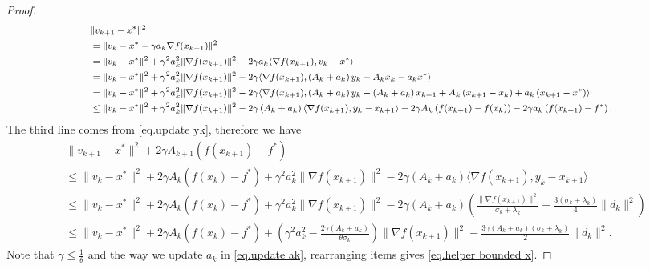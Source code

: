 \documentclass{article}
\begin{document}
\begin{proof}
    \begin{equation*}
    \footnotesize
        \begin{aligned}
            &\|v_{k+1}-x^*\|^2\\
            &= \|v_k-x^* -\gamma a_k \nabla f(x_{k+1})\|^2 \\
            &= \|v_k-x^*\|^2 +\gamma^2 a_k^2 \|\nabla f(x_{k+1})\|^2 -2\gamma a_k \langle \nabla f(x_{k+1}),v_k-x^*\rangle\\
            &= \|v_k-x^*\|^2 +\gamma^2 a_k^2 \|\nabla f(x_{k+1})\|^2 -2\gamma \langle \nabla f(x_{k+1}), \left (A_k+a_k\right)y_k-A_k x_k-a_k x^* \rangle\\
            &=\|v_k-x^*\|^2 +\gamma^2 a_k^2 \|\nabla f(x_{k+1})\|^2-2\gamma \langle \nabla f(x_{k+1}), \left (A_k+a_k\right)y_k-\left(A_k+a_k\right)x_{k+1}+A_k\left(x_{k+1}- x_k\right)+a_k \left(x_{k+1}-x^*\right) \rangle\\
            &\leq\|v_k-x^*\|^2 +\gamma^2 a_k^2 \|\nabla f(x_{k+1})\|^2-2\gamma \left (A_k+a_k\right)\langle \nabla f(x_{k+1}), y_k-x_{k+1} \rangle-2\gamma A_k \left (f(x_{k+1})-f(x_k)\right)-2\gamma a_k\left (f(x_{k+1})-f^*\right).
        \end{aligned}
    \end{equation*}
    The third line comes from \eqref{eq.update yk}, therefore we have
    \begin{equation*}
    \begin{aligned}
        &\|v_{k+1}-x^*\|^2 +2\gamma A_{k+1} \left (f(x_{k+1})-f^*\right)\\
        &\leq \|v_k-x^*\|^2+2\gamma A_k \left (f(x_k)-f^*\right )+\gamma^2 a_k^2 \|\nabla f(x_{k+1})\|^2-2\gamma \left (A_k+a_k\right)\langle \nabla f(x_{k+1}), y_k-x_{k+1} \rangle\\
        &\leq\|v_k-x^*\|^2+2\gamma A_k \left (f(x_k)-f^*\right )+\gamma^2 a_k^2 \|\nabla f(x_{k+1})\|^2-2\gamma \left (A_k+a_k\right)\left (\frac{\|\nabla f(x_{k+1})\|^2}{\sigma_k+\lambda_k}+\frac{3(\sigma_k+\lambda_k)}{4}\|d_k\|^2\right)\\
        &\leq \|v_k-x^*\|^2+2\gamma A_k \left (f(x_k)-f^*\right )+\left(\gamma^2 a_k^2-\frac{2\gamma(A_k+a_k)}{\theta \sigma_k}\right)\|\nabla f(x_{k+1})\|^2 -\frac{3\gamma(A_k+a_k)(\sigma_k+\lambda_k)}{2}\|d_k\|^2.
    \end{aligned}
    \end{equation*}
    Note that $\gamma \leq \frac{1}{\theta}$ and the way we update $a_k$ in \eqref{eq.update ak}, rearranging items gives \eqref{eq.helper bounded x}.

\end{proof}
\end{document}
